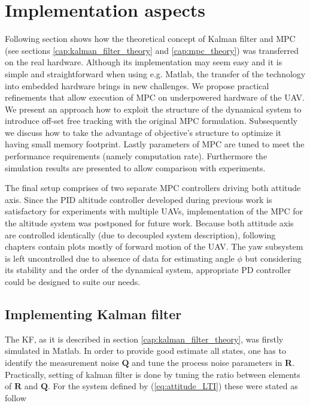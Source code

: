 \section{Implementation aspects}
\label{cap:Implementation}

Following section shows how the theoretical concept of Kalman filter and MPC (see sections \ref{cap:kalman_filter_theory} and \ref{cap:mpc_theory}) was transferred on the real hardware. Although its implementation may seem easy and it is simple and straightforward when using e.g. Matlab, the transfer of the technology into embedded hardware brings in new challenges. We propose practical refinements that allow execution of MPC on underpowered hardware of the UAV. We present an approach how to exploit the structure of the dynamical system to introduce off-set free tracking with the original MPC formulation. Subsequently we discuss how to take the advantage of objective's structure to optimize it having small memory footprint. Lastly parameters of MPC are tuned to meet the performance requirements (namely computation rate). Furthermore the simulation results are presented to allow comparison with experiments.

The final setup comprises of two separate MPC controllers driving both attitude axis. Since the PID altitude controller developed during previous work \citep{endrych2014} is satisfactory for experiments with multiple UAVs, implementation of the MPC for the altitude system was postponed for future work. Because both attitude axis are controlled identically (due to decoupled system description), following chapters contain plots mostly of forward motion of the UAV. The yaw subsystem is left uncontrolled due to absence of data for estimating angle $\phi$ but considering its stability and the order of the dynamical system, appropriate PD controller could be designed to suite our needs.

\subsection{Implementing Kalman filter}

The KF, as it is described in section \ref{cap:kalman_filter_theory}, was firstly simulated in Matlab. In order to provide good estimate all states, one has to identify the measurement noise $\textbf{Q}$ and tune the process noise parameters in \textbf{R}. Practically, setting of kalman filter is done by tuning the ratio between elements of $\textbf{R}$ and $\textbf{Q}$. For the system defined by (\ref{eq:attitude_LTI}) these were stated as follow

